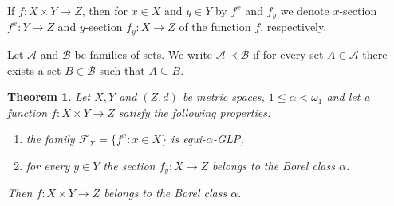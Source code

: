 \documentclass[a4paper]{amsart}
\theoremstyle{plain}
\newtheorem{theorem}{Theorem}[section]
\theoremstyle{definition}
\theoremstyle{remark}
\numberwithin{equation}{section}
\begin{document}
	If $f\colon X\times Y\to Z$, then for $x\in X$ and $y\in Y$ by $f^x$ and $f_y$ we denote $x$-section  $f^x\colon Y\to Z$ and $y$-section $f_y\colon X\to Z$  of the function $f$, respectively.
	
	 Let $\mathcal A$ and $\mathcal B$ be families of sets. We write $\mathcal A\prec\mathcal B$ if for every set $A\in\mathcal A$ there exists a set $B\in\mathcal B$ such that $A\subseteq B$.
	
 \begin{theorem}
 Let $X, Y$ and $(Z,d)$ be metric spaces, $1\le\alpha<\omega_1$ and let a function $f\colon X\times Y\to Z$ satisfy the following properties:
 \begin{enumerate}
 	\item the family $\mathscr F_X=\{f^x: x\in X\}$ is equi-$\alpha$-GLP,
 	
 	\item for every $y\in Y$ the section $f_y\colon X\to Z$ belongs to the Borel class $\alpha$. 
 \end{enumerate}
 
 Then $f\colon X\times Y\to Z$ belongs to the  Borel class $\alpha$.
\end{theorem}
\end{document}
